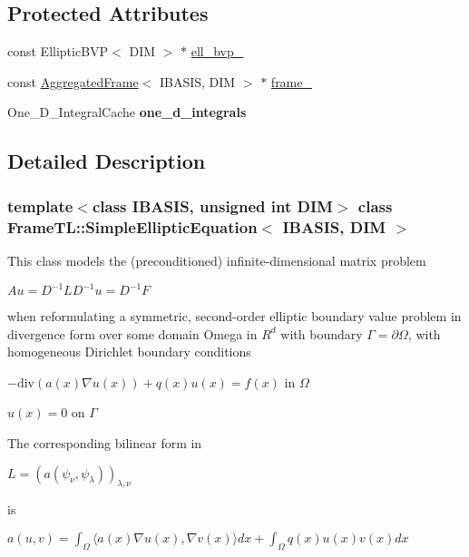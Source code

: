 \subsection*{Protected Attributes}
\begin{CompactItemize}
\item 
const EllipticBVP$<$ DIM $>$ $\ast$ \hyperlink{classFrameTL_1_1SimpleEllipticEquation_8070f6b619aac2cb61020481df7b09a8}{ell\_\-bvp\_\-}
\item 
const \hyperlink{classFrameTL_1_1AggregatedFrame}{AggregatedFrame}$<$ IBASIS, DIM $>$ $\ast$ \hyperlink{classFrameTL_1_1SimpleEllipticEquation_8cd2f036aa5557d584d8be5acf80e958}{frame\_\-}
\item 
\hypertarget{classFrameTL_1_1SimpleEllipticEquation_8aa50bb9639ba9bf29f10a067eeb97ca}{
One\_\-D\_\-IntegralCache \textbf{one\_\-d\_\-integrals}}
\label{classFrameTL_1_1SimpleEllipticEquation_8aa50bb9639ba9bf29f10a067eeb97ca}

\end{CompactItemize}


\subsection{Detailed Description}
\subsubsection*{template$<$class IBASIS, unsigned int DIM$>$ class FrameTL::SimpleEllipticEquation$<$ IBASIS, DIM $>$}

This class models the (preconditioned) infinite-dimensional matrix problem

$Au = D^{-1}LD^{-1}u = D^{-1}F$

when reformulating a symmetric, second-order elliptic boundary value problem in divergence form over some domain Omega in $R^d$ with boundary $\Gamma=\partial \Omega$, with homogeneous Dirichlet boundary conditions

$-\mbox{div}(a(x)\nabla u(x)) + q(x)u(x) = f(x)$ in $\Omega$\par
 $u(x) = 0$ on $\Gamma$\par


The corresponding bilinear form in

$L = (a(\psi_\nu,\psi_\lambda))_{\lambda,\nu}$

is

$a(u,v) = \int_\Omega \langle a(x) \nabla u(x), \nabla v(x)\rangle dx + \int_\Omega q(x) u(x) v(x) dx$

